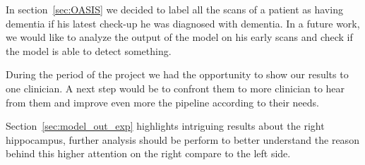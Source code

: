 In section~\ref{sec:OASIS} we decided to label all the scans of a patient as having dementia if his latest check-up he was diagnosed with dementia. In a future work, we would like to analyze the output of the model on his early scans and check if the model is able to detect something.

During the period of the project we had the opportunity to show our results to one clinician. A next step would be to confront them to more clinician to hear from them and improve even more the pipeline according to their needs.

Section~\ref{sec:model_out_exp} highlights intriguing results about the right hippocampus, further analysis should be perform to better understand the reason behind this higher attention on the right compare to the left side. 

